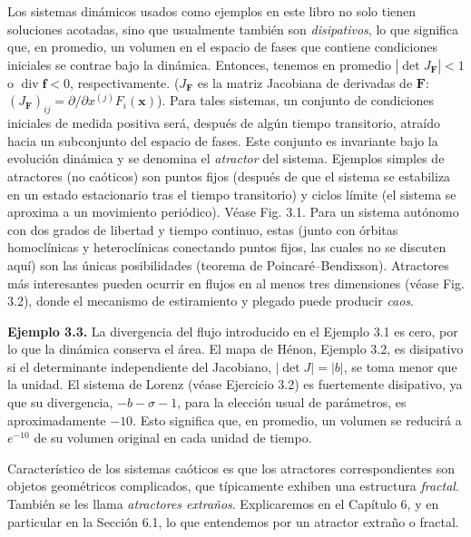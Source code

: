 \documentclass[10pt,a4paper]{book}
\begin{document}
Los sistemas dinámicos usados como ejemplos en este libro no solo tienen soluciones acotadas, sino que usualmente también son \textit{disipativos}, lo que significa que, en promedio, un volumen en el espacio de fases que contiene condiciones iniciales se contrae bajo la dinámica. Entonces, tenemos en promedio $|\det J_{\mathbf{F}}| < 1$ o $\operatorname{div} \mathbf{f} < 0$, respectivamente. ($J_{\mathbf{F}}$ es la matriz Jacobiana de derivadas de $\mathbf{F}$: $(J_{\mathbf{F}})_{ij} = \partial / \partial x^{(j)} F_i(\mathbf{x})$). Para tales sistemas, un conjunto de condiciones iniciales de medida positiva será, después de algún tiempo transitorio, atraído hacia un subconjunto del espacio de fases. Este conjunto es invariante bajo la evolución dinámica y se denomina el \textit{atractor} del sistema. Ejemplos simples de atractores (no caóticos) son puntos fijos (después de que el sistema se estabiliza en un estado estacionario tras el tiempo transitorio) y ciclos límite (el sistema se aproxima a un movimiento periódico). Véase Fig. 3.1. Para un sistema autónomo con dos grados de libertad y tiempo continuo, estas (junto con órbitas homoclínicas y heteroclínicas conectando puntos fijos, las cuales no se discuten aquí) son las únicas posibilidades (teorema de Poincaré–Bendixson). Atractores más interesantes pueden ocurrir en flujos en al menos tres dimensiones (véase Fig. 3.2), donde el mecanismo de estiramiento y plegado puede producir \textit{caos}.  

\bigskip

\textbf{Ejemplo 3.3.} La divergencia del flujo introducido en el Ejemplo 3.1 es cero, por lo que la dinámica conserva el área. El mapa de Hénon, Ejemplo 3.2, es disipativo si el determinante independiente del Jacobiano, $|\det J| = |b|$, se toma menor que la unidad. El sistema de Lorenz (véase Ejercicio 3.2) es fuertemente disipativo, ya que su divergencia, $-b - \sigma - 1$, para la elección usual de parámetros, es aproximadamente $-10$. Esto significa que, en promedio, un volumen se reducirá a $e^{-10}$ de su volumen original en cada unidad de tiempo.

Característico de los sistemas caóticos es que los atractores correspondientes son objetos geométricos complicados, que típicamente exhiben una estructura \textit{fractal}. También se les llama \textit{atractores extraños}. Explicaremos en el Capítulo 6, y en particular en la Sección 6.1, lo que entendemos por un atractor extraño o fractal.
\end{document}

